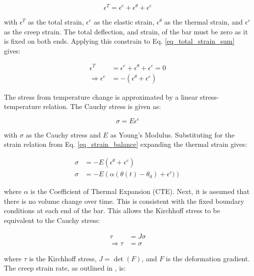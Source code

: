 \documentclass[conf]{new-aiaa}
\begin{document}
\begin{equation}
\epsilon^T = \epsilon^e  + \epsilon^\theta+ \epsilon^c
\label{eq_total_strain_sum}
\end{equation}

\noindent
with $\epsilon^T$ as the total strain,
$\epsilon^e$ as the elastic strain,
$\epsilon^\theta$ as the thermal strain,
and
$\epsilon^c$ as the creep strain.
The total deflection, and strain, of the bar must be zero as it 
is fixed on both ends.
Applying this constrain to Eq. \ref{eq_total_strain_sum} gives:

\begin{align}
\epsilon^T &= \epsilon^e + \epsilon^\theta + \epsilon^c = 0 \\
\Rightarrow
  \epsilon^e &= -\left( \epsilon^\theta + \epsilon^c \right)  \label{eq_strain_balance}
\end{align}

\noindent
The stress from temperature change is approximated by
a linear stress-temperature relation. 
The Cauchy stress is given as:

\begin{equation}
\sigma = E  \epsilon^e 
\end{equation}

\noindent
with $\sigma$ as the Cauchy stress and $E$ as Young's Modulus.
Substituting for the strain relation from Eq. \ref{eq_strain_balance} 
expanding the thermal strain gives:

\begin{align}
\sigma &= -E \left( \epsilon^\theta + \epsilon^c \right)  \\
\sigma &= -E \left( \alpha (\theta(t) - \theta_0) + \epsilon^c) \right) 
\label{eq_cauchy_stress_sum}
\end{align}

\noindent
where $\alpha$ is the Coefficient of Thermal Expansion (CTE).
Next, it is assumed that there is no volume change over time.
This is consistent with the fixed boundary conditions at 
each end of the bar.
This allows the Kirchhoff stress to be equivalent to the Cauchy stress:

\begin{align}
\tau &= J \sigma \\
\Rightarrow
  \tau &= \sigma \label{eq_cauchy_to_kirchoff}
\end{align}

\noindent
where $\tau$ is the Kirchhoff stress,
$J=\det(F)$,
and $F$ is the deformation gradient.
The creep strain rate, as outlined in 
\cite{ li_simulation_of_finite_strain_inelastic_phenomena_governed_by_creep_and_plasticity},
is:
\end{document}
